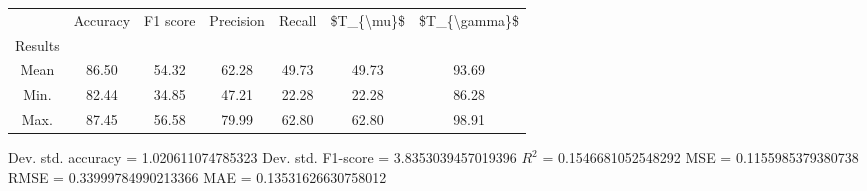 \begin{tabular}{|c|c|c|c|c|c|c|}
\toprule
{} &  Accuracy &  F1 score &  Precision &  Recall &  \$T\_\{\textbackslash mu\}\$ &  \$T\_\{\textbackslash gamma\}\$ \\
Results &           &           &            &         &            &               \\
\hline
Mean    &     86.50 &     54.32 &      62.28 &   49.73 &      49.73 &         93.69 \\
Min.    &     82.44 &     34.85 &      47.21 &   22.28 &      22.28 &         86.28 \\
Max.    &     87.45 &     56.58 &      79.99 &   62.80 &      62.80 &         98.91 \\
\bottomrule
\end{tabular}

 Dev. std. accuracy = 1.020611074785323
 Dev. std. F1-score = 3.8353039457019396
 $R^2$ = 0.1546681052548292
 MSE = 0.1155985379380738
 RMSE = 0.33999784990213366
 MAE = 0.13531626630758012